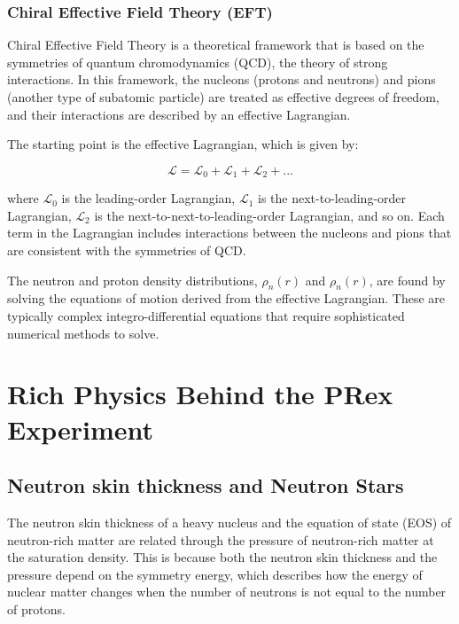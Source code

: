 \subsubsection{Chiral Effective Field Theory (EFT)}

Chiral Effective Field Theory is a theoretical framework that is based on the symmetries of quantum chromodynamics (QCD), the theory of strong interactions. In this framework, the nucleons (protons and neutrons) and pions (another type of subatomic particle) are treated as effective degrees of freedom, and their interactions are described by an effective Lagrangian.

The starting point is the effective Lagrangian, which is given by:

\begin{equation}
    \mathcal{L} =\mathcal{L}_0 + \mathcal{L}_1 + \mathcal{L}_2 + ...
\end{equation}

where $\mathcal{L}_0$ is the leading-order Lagrangian, $\mathcal{L}_1$ is the next-to-leading-order Lagrangian, $\mathcal{L}_2$ is the next-to-next-to-leading-order Lagrangian, and so on. Each term in the Lagrangian includes interactions between the nucleons and pions that are consistent with the symmetries of QCD.

The neutron and proton density distributions, $\rho_n(r)$ and $\rho_n(r)$, are found by solving the equations of motion derived from the effective Lagrangian. These are typically complex integro-differential equations that require sophisticated numerical methods to solve.

\section{Rich Physics Behind the PRex Experiment}

\subsection{Neutron skin thickness and Neutron Stars}

The neutron skin thickness of a heavy nucleus and the equation of state (EOS) of neutron-rich matter are related through the pressure of neutron-rich matter at the saturation density. This is because both the neutron skin thickness and the pressure depend on the symmetry energy, which describes how the energy of nuclear matter changes when the number of neutrons is not equal to the number of protons.

